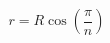 \documentclass[12pt]{article}
\begin{document}
\[
    r = R\cos\left(\frac{\pi}{n}\right)
\]
\end{document}
